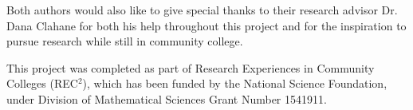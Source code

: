 \documentclass[12pt]{amsart}
\theoremstyle{definition}
\theoremstyle{remark}
\begin{document}
Both authors would also like to give special thanks to their research advisor Dr. Dana Clahane
for both his help throughout this project and for the inspiration to pursue research while
still in community college.

This project was completed as part of Research Experiences in Community Colleges (REC$^2$), 
which has been funded by the National Science Foundation, 
under Division of Mathematical Sciences Grant Number 1541911.

\newpage

\printbibliography
\end{document}
